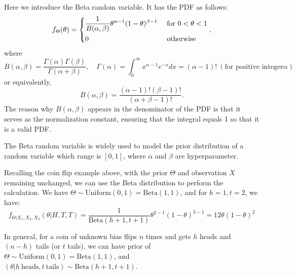 Here we introduce the Beta random variable. It has the PDF as follows: 
\[
  f_{\Theta} (\theta) = \begin{dcases}
    \dfrac{1}{B(\alpha, \beta)} \theta^{\alpha-1} (1 - \theta)^{\beta - 1} &\text{ for } 0 < \theta < 1 \\
    0 &\text{ otherwise} 
  \end{dcases}, 
\]
where 
\[
  B(\alpha, \beta) = \dfrac{\Gamma(\alpha)\Gamma(\beta)}{\Gamma(\alpha + \beta)}, \quad \Gamma(\alpha) = \int_0^{\infty} x^{\alpha-1} e^{-x} dx = (\alpha - 1)!\ (\text{for positive integer} \alpha)
\]
or equivalently,
\[
  B(\alpha, \beta) = \dfrac{(\alpha - 1)!(\beta - 1)!}{(\alpha + \beta -1)!} .
\]
The reason why \(B(\alpha, \beta)\) appears in the denominator of the PDF is that it serves as the normalization constant, ensuring that the integral equals 1 so that it is a valid PDF.

The Beta random variable is widely used to model the prior distribution of a random variable which range is \([0, 1]\), where \(\alpha\) and \(\beta\) are hyperparameter. 

Recalling the coin flip example above, with the prior \(\Theta\) and observation \(X\) remaining unchanged, we can use the Beta distribution to perform the calculation. We have \(\Theta \sim \text{Uniform}(0, 1) = \text{Beta}(1, 1)\), and for \(h = 1, t = 2\), we have:
\[
  f_{\Theta \vert X_1, X_2, X_3} (\theta \vert H, T, T) = \dfrac{1}{\text{Beta}(h + 1, t + 1)} \theta^{2-1} (1 - \theta)^{3 - 1} = 12\theta (1 - \theta)^2
\]

In general, for a coin of unknown bias flips \(n\) times and gets \(h\) heads and \((n - h)\) tails (or \(t\) tails), we can have prior of \(\Theta \sim \text{Uniform}(0, 1) = \text{Beta}(1, 1)\), and \((\theta \vert h\ \text{heads}, t\ \text{tails}) \sim \text{Beta} (h + 1, t + 1)\). 

